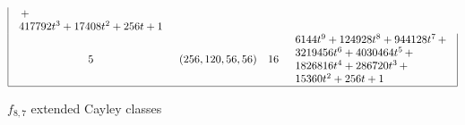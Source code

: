 \documentclass[12pt,a4paper]{article}
\begin{document}
\begin{table}[!bhpt]
\begin{align*}
\begin{array}{|cccl|}
\begin{array}{l}
\,+
\\
 417792t^{3} + 17408t^{2} + 256t + 1
\end{array}
\\
5 &
(256, 120, 56, 56) &
16 &
\begin{array}{l}
6144t^{9} + 124928t^{8} + 944128t^{7}
\,+
\\
 3219456t^{6} + 4030464t^{5}
\,+
\\
 1826816t^{4} + 286720t^{3}
\,+
\\
 15360t^{2} + 256t + 1
\end{array}
\\
\hline
\end{array}
\end{align*}
\caption{$f_{8,7}$ extended Cayley classes}
\label{tab-c8_7_EC_classes}
\end{table}
\end{document}
